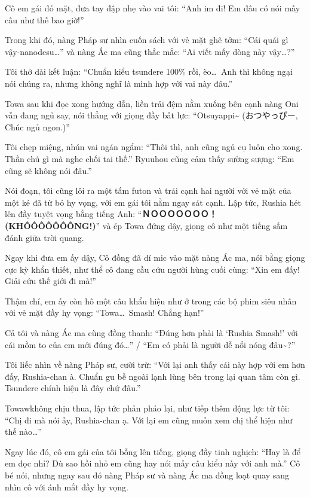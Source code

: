 \documentclass[../main.tex]{subfiles}
\begin{document}
Cô em gái đỏ mặt, đưa tay đập nhẹ vào vai tôi: ``Anh im đi! Em đâu có nói mấy câu như thế bao giờ!''

Trong khi đó, nàng Pháp sư nhìn cuốn sách với vẻ mặt ghê tởm: ``Cái quái gì vậy-nanodesu\dots'' và nàng Ác ma cũng thắc mắc: ``Ai viết mấy dòng này vậy\dots?''

Tôi thở dài kết luận: ``Chuẩn kiểu tsundere 100\% rồi, èo\dots\ Anh thì không ngại nói chúng ra, nhưng không nghĩ là mình hợp với vai này đâu.''

Towa sau khi đọc xong hướng dẫn, liền trải đệm nằm xuống bên cạnh nàng Oni vẫn đang ngủ say, nói thẳng với giọng đầy bất lực: ``Otsuyappi\~{} (おつやっぴー, Chúc ngủ ngon.)''

Tôi chẹp miệng, nhún vai ngán ngẩm: ``Thôi thì, anh cũng ngủ cụ luôn cho xong. Thần chú gì mà nghe chối tai thế.'' Ryuuhou cũng cảm thấy sường sượng: ``Em cũng sẽ không nói đâu.''

Nói đoạn, tôi cũng lôi ra một tấm futon và trải cạnh hai người với vẻ mặt của một kẻ đã từ bỏ hy vọng, với em gái tôi nằm ngay sát cạnh. Lập tức, Rushia hét lên đầy tuyệt vọng bằng tiếng Anh: ``\textbf{ＮＯＯＯＯＯＯＯ！​ (KHÔÔÔÔÔÔÔNG!)}'' và ép Towa đứng dậy, giọng cô như một tiếng sấm đánh giữa trời quang.


Ngay khi đưa em ấy dậy, Cô đồng đã dí mic vào mặt nàng Ác ma, nói bằng giọng cực kỳ khẩn thiết, như thể cô đang cầu cứu người hùng cuối cùng: ``Xin em đấy! Giải cứu thế giới đi mà!''

Thậm chí, em ấy còn hô một câu khẩu hiệu như ở trong các bộ phim siêu nhân với vẻ mặt đầy hy vọng: ``Towa\dots\ Smash! Chẳng hạn!''

Cả tôi và nàng Ác ma cùng đồng thanh: ``Đúng hơn phải là `Rushia Smash!' với cái mồm to của em mới đúng đó\dots'' / ``Em có phải là người dễ nổi nóng đâu\~{}?''

Tôi liếc nhìn về nàng Pháp sư, cười trừ: ``Với lại anh thấy cái này hợp với em hơn đấy, Rushia-chan à. Chuẩn gu bề ngoài lạnh lùng bên trong lại quan tâm còn gì. Tsundere chính hiệu là đây chứ đâu.''

Towawkhông chịu thua, lập tức phản pháo lại, như tiếp thêm động lực từ tôi: ``Chị đi mà nói ấy, Rushia-chan ạ. Với lại em cũng muốn xem chị thể hiện như thế nào\dots''

Ngay lúc đó, cô em gái của tôi bỗng lên tiếng, giọng đầy tinh nghịch: ``Hay là để em đọc nhỉ? Dù sao hồi nhỏ em cũng hay nói mấy câu kiểu này với anh mà.'' Cô bé nói, nhưng ngay sau đó nàng Pháp sư và nàng Ác ma đồng loạt quay sang nhìn cô với ánh mắt đầy hy vọng.
\end{document}
